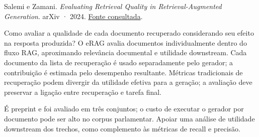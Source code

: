 {\small Salemi e Zamani. \textit{Evaluating Retrieval Quality in Retrieval-Augmented Generation}. arXiv · 2024. \href{https://arxiv.org/abs/2404.13781}{Fonte consultada}.\par}
Como avaliar a qualidade de cada documento recuperado considerando seu efeito na resposta produzida?
O eRAG avalia documentos individualmente dentro do fluxo RAG, aproximando relevância documental e utilidade downstream.
Cada documento da lista de recuperação é usado separadamente pelo gerador; a contribuição é estimada pelo desempenho resultante.
Métricas tradicionais de recuperação podem divergir da utilidade efetiva para a geração; a avaliação deve preservar a ligação entre recuperação e tarefa final.
\begin{itemize}
\end{itemize}
É preprint e foi avaliado em três conjuntos; o custo de executar o gerador por documento pode ser alto no corpus parlamentar.
Apoiar uma análise de utilidade downstream dos trechos, como complemento às métricas de recall e precisão.
\clearpage
